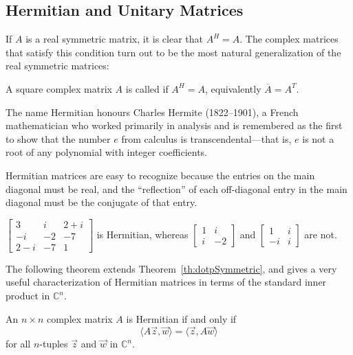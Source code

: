 \documentclass{ximera}
\begin{document}
\subsection*{Hermitian and Unitary Matrices}


If $A$ is a real symmetric matrix, it is clear that $A^{H} = A$. The complex matrices that satisfy this condition turn out to be the
most natural generalization of the real symmetric matrices:

\begin{definition}\label{def:Hermitian}
A square complex matrix $A$ is called  if $A^{H} = A$, equivalently $\overline{A} = A^T$.
\end{definition}
\begin{remark}
The name Hermitian honours Charles Hermite (1822--1901), a French
mathematician who worked primarily in analysis and is remembered as the
first to show that the number $e$ from calculus is transcendental---that is, $e$ is not a root of any polynomial with integer coefficients.
\end{remark}

Hermitian matrices are easy to
recognize because the entries on the main diagonal must be real, and the
 ``reflection'' of each off-diagonal entry in the main diagonal must be the
 conjugate of that entry.

\begin{example}\label{ex:025690}
$\left[ \begin{array}{ccc}
3 & i & 2 + i \\
-i & -2 & -7 \\
2 - i & -7 & 1
\end{array}\right]$
 is Hermitian, whereas $\left[ \begin{array}{rr}
 1 & i \\
 i & -2
 \end{array}\right]$ and $\left[ \begin{array}{rr}
 1 & i \\
 -i & i
 \end{array}\right]$ are not.
\end{example}

The following theorem extends Theorem~\ref{th:dotpSymmetric}, and gives a very useful characterization of Hermitian matrices in terms of the standard inner product in $\mathbb{C}^n$.


\begin{theorem}\label{th:025697}
An $n \times n$ complex matrix $A$ is Hermitian if and only if
\begin{equation*}
\langle A\vec{z}, \vec{w} \rangle = \langle \vec{z}, A\vec{w} \rangle
\end{equation*}
for all $n$-tuples $\vec{z}$ and $\vec{w}$ in $\mathbb{C}^n$.
\end{theorem}
\end{document}
